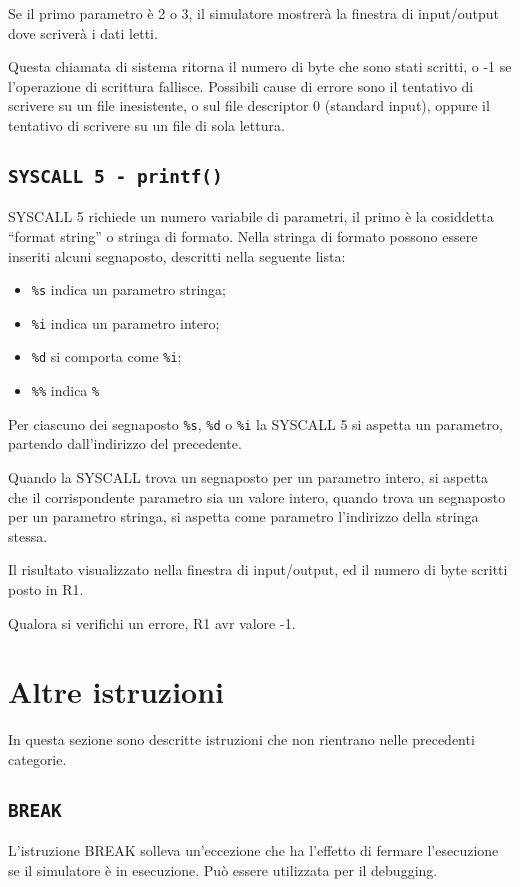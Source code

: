 \documentclass[12pt]{report}
\begin{document}
Se il primo parametro \`{e} 2 o 3, il simulatore mostrer\`{a} la finestra di input/output dove scriver\`{a} i dati letti.

Questa chiamata di sistema ritorna il numero di byte che sono stati scritti, o -1 se l'operazione di scrittura fallisce. 
Possibili cause di errore sono il tentativo di scrivere su un file inesistente, o sul file descriptor 0 (standard input), 
oppure il tentativo di scrivere su un file di sola lettura.

\label{sys5}
\subsection{\texttt{SYSCALL 5 - printf()}}
SYSCALL 5 richiede un numero variabile di parametri, il primo \`{e} la cosiddetta
``format string'' o stringa di formato. Nella stringa di formato possono essere inseriti alcuni segnaposto,
descritti nella seguente lista:
\begin{itemize}
	\item \texttt{\%s} indica un parametro stringa;
	\item \texttt{\%i} indica un parametro intero;
	\item \texttt{\%d} si comporta come \texttt{\%i};
	\item \texttt{\%\%} indica \texttt{\%}
\end{itemize}

Per ciascuno dei segnaposto \texttt{\%s}, \texttt{\%d} o \texttt{\%i} la SYSCALL 5
si aspetta un parametro, partendo dall'indirizzo del precedente.

Quando la SYSCALL trova un segnaposto per un parametro intero, si aspetta che
il corrispondente parametro sia un valore intero, quando trova un segnaposto per un 
parametro stringa, si aspetta come parametro l'indirizzo della stringa stessa.

Il risultato  visualizzato nella finestra di input/output, ed il numero di byte scritti 
 posto in R1.

Qualora si verifichi un errore, R1 avr valore -1.

\section{Altre istruzioni}
In questa sezione sono descritte istruzioni che non rientrano nelle precedenti categorie.
\subsection{\texttt{BREAK}}
L'istruzione BREAK solleva un'eccezione che ha l'effetto di fermare l'esecuzione 
se il simulatore \`{e} in esecuzione. Pu\`{o} essere utilizzata per il debugging.
\end{document}
